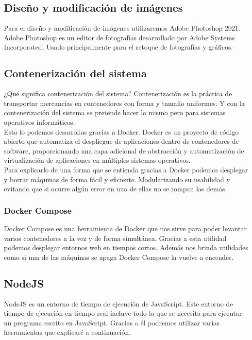 \subsection{Diseño y modificación de imágenes}

Para el diseño y modificación de imágenes utilizaremos Adobe Photoshop 2021. Adobe Photoshop es un editor de fotografías desarrollado por Adobe Systems Incorporated. Usado principalmente para el retoque de fotografías y gráficos.

\subsection{Contenerización del sistema}

¿Qué significa contenerización del sistema? Contenerización es la práctica de transportar mercancías en contenedores con forma y tamaño uniformes. Y con la contenerización del sistema se pretende hacer lo mismo pero para sistemas operativos informáticos.
\\Esto lo podemos desarrollas gracias a Docker. Docker es un proyecto de código abierto que automatiza el despliegue de aplicaciones dentro de contenedores de software, proporcionando una capa adicional de abstracción y automatización de virtualización de aplicaciones en múltiples sistemas operativos.
\\Para explicarlo de una forma que se entienda gracias a Docker podemos desplegar y borrar máquinas de forma fácil y eficiente. Modularizando su usabilidad y evitando que si ocurre algún error en una de ellas no se rompan las demás.

\subsubsection{Docker Compose}

Docker Compose es una herramienta de Docker que nos sirve para poder levantar varios contenedores a la vez y de forma simultánea. Gracias a esta utilidad podemos desplegar entornos web en tiempos cortos. Además nos brinda utilidades como si una de las máquinas se apaga Docker Compose la vuelve a encender.

\subsection{NodeJS}

NodeJS es un entorno de tiempo de ejecución de JavaScript. Este entorno de tiempo de ejecución en tiempo real incluye todo lo que se necesita para ejecutar un programa escrito en JavaScript. Gracias a él podremos utilizar varias herramientas que explicaré a continuación.


